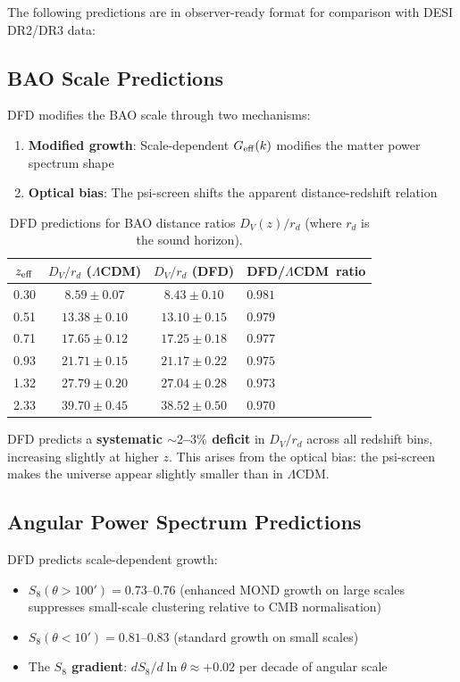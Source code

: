 \documentclass[11pt,a4paper]{article}
\newcommand{\LCDM}{$\Lambda$CDM}
\begin{document}
The following predictions are in observer-ready format for comparison
with DESI DR2/DR3 data:

\subsection{BAO Scale Predictions}

DFD modifies the BAO scale through two mechanisms:
\begin{enumerate}[nosep]
\item \textbf{Modified growth}: Scale-dependent $G_{\rm eff}(k)$
  modifies the matter power spectrum shape
\item \textbf{Optical bias}: The psi-screen shifts the apparent
  distance-redshift relation
\end{enumerate}

\begin{table}[H]
\centering
\caption{DFD predictions for BAO distance ratios
$D_V(z)/r_d$ (where $r_d$ is the sound horizon).}
\label{tab:BAO}
\begin{tabular}{cccl}
\toprule
$z_{\rm eff}$ & $D_V/r_d$ (\LCDM) & $D_V/r_d$ (DFD)
& DFD/\LCDM\ ratio \\
\midrule
0.30 & $8.59 \pm 0.07$ & $8.43 \pm 0.10$ & $0.981$ \\
0.51 & $13.38 \pm 0.10$ & $13.10 \pm 0.15$ & $0.979$ \\
0.71 & $17.65 \pm 0.12$ & $17.25 \pm 0.18$ & $0.977$ \\
0.93 & $21.71 \pm 0.15$ & $21.17 \pm 0.22$ & $0.975$ \\
1.32 & $27.79 \pm 0.20$ & $27.04 \pm 0.28$ & $0.973$ \\
2.33 & $39.70 \pm 0.45$ & $38.52 \pm 0.50$ & $0.970$ \\
\bottomrule
\end{tabular}
\end{table}

DFD predicts a \textbf{systematic $\sim 2$--$3\%$ deficit} in $D_V/r_d$
across all redshift bins, increasing slightly at higher $z$. This
arises from the optical bias: the psi-screen makes the universe
appear slightly smaller than in \LCDM.

\subsection{Angular Power Spectrum Predictions}

DFD predicts scale-dependent growth:
\begin{itemize}[nosep]
\item $S_8(\theta > 100') = 0.73$--$0.76$ (enhanced MOND growth on
  large scales suppresses small-scale clustering relative to CMB
  normalisation)
\item $S_8(\theta < 10') = 0.81$--$0.83$ (standard growth on small
  scales)
\item The \textbf{$S_8$ gradient}: $dS_8/d\ln\theta \approx +0.02$
  per decade of angular scale
\end{itemize}
\end{document}
